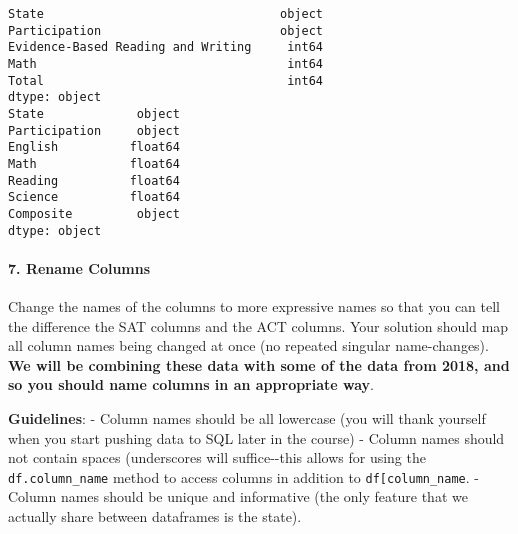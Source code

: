 \documentclass[11pt]{article}
\begin{document}
    \begin{Verbatim}[commandchars=\\\{\}]
State                                 object
Participation                         object
Evidence-Based Reading and Writing     int64
Math                                   int64
Total                                  int64
dtype: object
State             object
Participation     object
English          float64
Math             float64
Reading          float64
Science          float64
Composite         object
dtype: object

    \end{Verbatim}

    \paragraph{7. Rename Columns}\label{rename-columns}

Change the names of the columns to more expressive names so that you can
tell the difference the SAT columns and the ACT columns. Your solution
should map all column names being changed at once (no repeated singular
name-changes). \textbf{We will be combining these data with some of the
data from 2018, and so you should name columns in an appropriate way}.

\textbf{Guidelines}: - Column names should be all lowercase (you will
thank yourself when you start pushing data to SQL later in the course) -
Column names should not contain spaces (underscores will suffice-\/-this
allows for using the \texttt{df.column\_name} method to access columns
in addition to
\texttt{df{[}\textquotesingle{}column\_name\textquotesingle{}{]}}. -
Column names should be unique and informative (the only feature that we
actually share between dataframes is the state).
\end{document}
